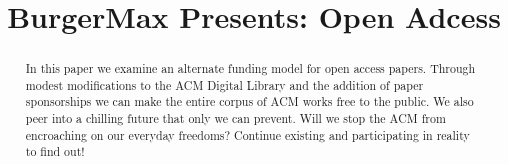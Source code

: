 \documentclass[sigtbd]{sigtbd17-style}
\begin{document}
\title{BurgerMax Presents: Open Adcess}
\maketitle

\begin{abstract}
  In this paper we examine an alternate funding model for open access papers.
  Through modest modifications to the ACM Digital Library and the addition of
  paper sponsorships we can make the entire corpus of ACM works free to the
  public.
  We also peer into a chilling future that only we can prevent.
  Will we stop the ACM from encroaching on our everyday freedoms?
  Continue existing and participating in reality to find out!
\end{abstract}













{}

\end{document}
